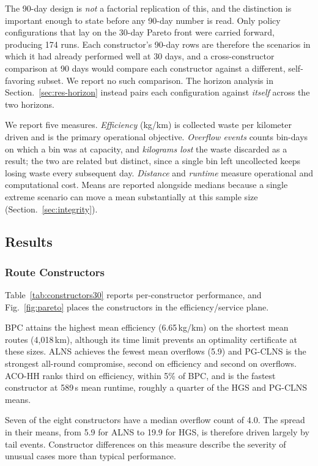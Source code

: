 \documentclass[orivec,runningheads]{llncs}
\begin{document}
The 90-day design is \emph{not} a factorial replication of this, and the
distinction is important enough to state before any 90-day number is read. Only
policy configurations that lay on the 30-day Pareto front were carried forward,
producing 174 runs. Each constructor's 90-day rows are therefore the scenarios
in which it had already performed well at 30 days, and a cross-constructor
comparison at 90 days would compare each constructor against a different,
self-favoring subset. We report no such comparison. The horizon analysis in
Section.~\ref{sec:res-horizon} instead pairs each configuration against
\emph{itself} across the two horizons.

We report five measures. \emph{Efficiency} (kg/km) is collected waste per
kilometer driven and is the primary operational objective. \emph{Overflow
events} counts bin-days on which a bin was at capacity, and \emph{kilograms
lost} the waste discarded as a result; the two are related but distinct, since a
single bin left uncollected keeps losing waste every subsequent day.
\emph{Distance} and \emph{runtime} measure operational and computational cost.
Means are reported alongside medians because a single extreme scenario can move
a mean substantially at this sample size (Section.~\ref{sec:integrity}).


\subsection{Results}

\subsubsection{Route Constructors}
\label{sec:res-constructors}

Table~\ref{tab:constructors30} reports per-constructor performance, and
Fig.~\ref{fig:pareto} places the constructors in the efficiency/service plane.

BPC attains the highest mean efficiency (6.65\,kg/km) on the shortest mean
routes (4{,}018\,km), although its time limit prevents an optimality certificate
at these sizes. ALNS achieves the fewest mean
overflows (5.9) and PG-CLNS is the strongest all-round compromise, second on
efficiency and second on overflows. ACO-HH ranks third on efficiency, within
5\% of BPC, and is the fastest constructor at 589\,s mean runtime, roughly a
quarter of the HGS and PG-CLNS means.

Seven of the eight constructors have a median overflow count of 4.0. The spread
in their means, from 5.9 for ALNS to 19.9 for HGS, is therefore driven largely
by tail events. Constructor differences on this measure describe the severity
of unusual cases more than typical performance.
\end{document}
